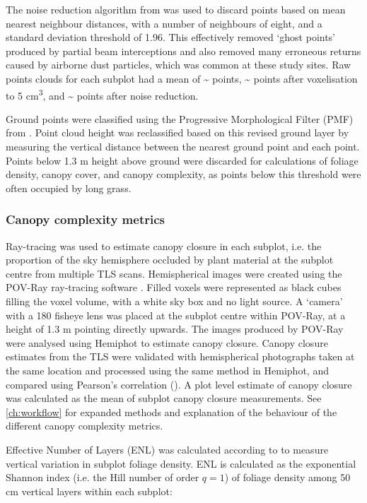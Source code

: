 \begin{refsection}
The noise reduction algorithm from \citet{Rusu2008} was used to discard points based on mean nearest neighbour distances, with a number of neighbours of eight, and a standard deviation threshold of 1.96. This effectively removed `ghost points' produced by partial beam interceptions and also removed many erroneous returns caused by airborne dust particles, which was common at these study sites. Raw points clouds for each subplot had a mean of \textasciitilde{}\rawpt{} points, \textasciitilde{}\voxelpt{} points after voxelisation to 5 cm\textsuperscript{3}, and \textasciitilde{}\subpt{} points after noise reduction. 

Ground points were classified using the Progressive Morphological Filter (PMF) from \citet{Zhang2003}. Point cloud height was reclassified based on this revised ground layer by measuring the vertical distance between the nearest ground point and each point. Points below 1.3 m height above ground were discarded for calculations of foliage density, canopy cover, and canopy complexity, as points below this threshold were often occupied by long grass.

\subsubsection{Canopy complexity metrics}
\label{tls:sssec:canopy_metrics}

Ray-tracing was used to estimate canopy closure in each subplot, i.e. the proportion of the sky hemisphere occluded by plant material at the subplot centre from multiple TLS scans. Hemispherical images were created using the POV-Ray ray-tracing software \citep{Povray2004}. Filled voxels were represented as black cubes filling the voxel volume, with a white sky box and no light source. A `camera' with a 180\textdegree{} fisheye lens was placed at the subplot centre within POV-Ray, at a height of 1.3 m pointing directly upwards. The images produced by POV-Ray were analysed using Hemiphot \citep{HemiPhot} to estimate canopy closure. Canopy closure estimates from the TLS were validated with hemispherical photographs taken at the same location and processed using the same method in Hemiphot, and compared using Pearson's correlation (\hemiCor{}). A plot level estimate of canopy closure was calculated as the mean of subplot canopy closure measurements. See \autoref{ch:workflow} for expanded methods and explanation of the behaviour of the different canopy complexity metrics.

Effective Number of Layers (ENL) was calculated according to \citet{Ehbrecht2016} to measure vertical variation in subplot foliage density. ENL is calculated as the exponential Shannon index (i.e. the Hill number of order $q=1$) of foliage density among 50 cm vertical layers within each subplot:


\end{refsection}
